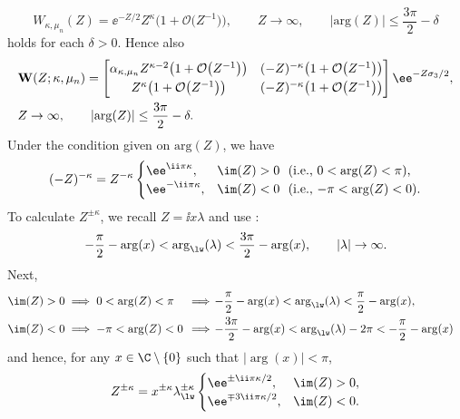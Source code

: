 \begin{equation*}
 W_{\kappa,\mu_n}(Z)=\ee^{-Z/2}Z^\kappa\big(1+\mathcal{O}\big(Z^{-1}\big)\big),\qquad Z\to\infty,\qquad |\mathrm{arg}(Z)|\le\frac{3\pi}{2}-\delta
\end{equation*}
holds for each $\delta>0$. Hence also
\begin{gather*} %
\begin{split}
& \mathbf{W}(Z;\kappa,\mu_n)=\begin{bmatrix}
 \alpha_{\kappa,\mu_n}Z^{\kappa-2}\big(1+\mathcal{O}\big(Z^{-1}\big)\big) & (-Z)^{-\kappa}\big(1+\mathcal{O}\big(Z^{-1}\big)\big)\vspace{1mm}\\
 Z^\kappa\big(1+\mathcal{O}\big(Z^{-1}\big)\big) & (-Z)^{-\kappa}\big(1+\mathcal{O}\big(Z^{-1}\big)\big)
 \end{bmatrix}\ee^{-Z\sigma_3/2},\\
 & Z\to\infty,\qquad |\mathrm{arg}(Z)|\le\frac{3\pi}{2}-\delta.
\end{split}
\end{gather*}
Under the condition given on $\mathrm{arg}(Z)$, we have
\begin{equation*}
 (-Z)^{-\kappa}=Z^{-\kappa}\begin{cases} \ee^{\ii\pi\kappa},& \text{$\im(Z)>0$ \ (i.e., $0<\arg(Z)<\pi$),}\\
 \ee^{-\ii\pi\kappa},& \text{$\im(Z)<0$ \ (i.e., $-\pi<\arg(Z)<0$).}
 \end{cases}
\end{equation*}
To calculate $Z^{\pm \kappa}$, we recall $Z=\ii x\lambda$ and use \cite[equation~(49)]{BMS18}:
\[
-\dfrac{\pi}{2} - \arg(x) < \mathrm{arg}_{\lw} (\lambda) < \dfrac{3\pi}{2} - \arg(x), \qquad |\lambda| \to \infty.
\]
Next,
\begin{align*}
\im(Z)>0 &\implies 0<\arg(Z) <\pi\!\!\!\! &&\implies\! -\frac{\pi}{2} - \arg(x)< \mathrm{arg}_{\lw}(\lambda) < \frac{\pi}{2} - \arg(x),\!& \\
\im(Z)<0 &\implies -\pi<\arg(Z) < 0\!\!\!\!\! &&\implies\! -\frac{3\pi}{2} - \arg(x) < \mathrm{arg}_{\lw}(\lambda) - 2\pi <-\dfrac{\pi}{2} - \arg(x)\!&
\end{align*}
and hence, for any $x \in \C \setminus \{0\}$ such that $|{\arg}(x)| < \pi$,
\[
Z^{\pm \kappa} = x^{\pm \kappa} \lambda_{\lw}^{\pm \kappa}\begin{cases} \ee^{\pm \ii \pi \kappa/2}, &\im(Z) > 0, \\ \ee^{\mp 3\ii \pi \kappa/2}, & \im(Z) < 0.
\end{cases}
\]
